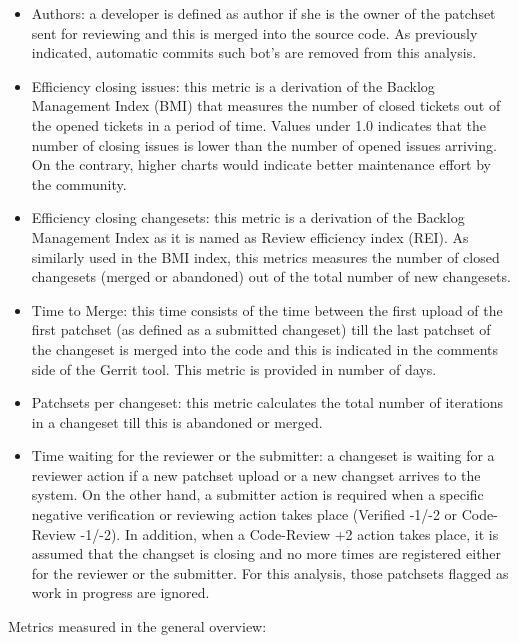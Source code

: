 \documentclass[a4wide,11pt]{report}
\begin{document}
\begin{itemize}
\item Authors: a developer is defined as author if she is the owner of the patchset sent for reviewing and this is 
merged into the source code. As previously indicated, automatic commits such bot's are removed from this analysis.

\item Efficiency closing issues: this metric is a derivation of the Backlog Management Index (BMI) that measures the number
of closed tickets out of the opened tickets in a period of time. Values under 1.0 indicates that the number of closing
issues is lower than the number of opened issues arriving. On the contrary, higher charts would indicate better
maintenance effort by the community.

\item Efficiency closing changesets: this metric is a derivation of the Backlog Management Index as it is named as
Review efficiency index (REI). As similarly used in the BMI index, this metrics measures the number of closed changesets
(merged or abandoned) out of the total number of new changesets.

\item Time to Merge: this time consists of the time between the first upload of the first patchset (as defined
as a submitted changeset) till the last patchset of the changeset is merged into the code and this is indicated in the 
comments side of the Gerrit tool. This metric is provided in number of days.

\item Patchsets per changeset: this metric calculates the total number of iterations in a changeset till this is abandoned
or merged.

\item Time waiting for the reviewer or the submitter: a changeset is waiting for a reviewer action if a new patchset upload
or a new changset arrives to the system. On the other hand, a submitter action is required when a specific negative verification
or reviewing action takes place (Verified -1/-2 or Code-Review -1/-2). In addition, when a Code-Review +2 action takes place,
it is assumed that the changset is closing and no more times are registered either for the reviewer or the submitter.
For this analysis, those patchsets flagged as work in progress are ignored.

\end{itemize}

Metrics measured in the general overview:
\end{document}
